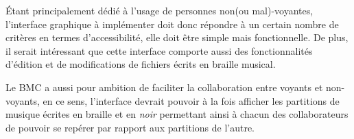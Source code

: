   Étant principalement dédié à l'usage de personnes non(ou mal)-voyantes, l'interface graphique à implémenter doit donc répondre à un certain nombre de critères en termes d'accessibilité, elle doit être simple mais fonctionnelle.
  De plus, il serait intéressant que cette interface comporte aussi des fonctionnalités d'édition et de modifications de fichiers écrits en braille musical.
   
  Le BMC a aussi pour ambition de faciliter la collaboration entre voyants et non-voyants, en ce sens, l'interface devrait pouvoir à la fois afficher les partitions de musique écrites en braille et en \textit{noir} permettant ainsi à chacun des collaborateurs de pouvoir se repérer par rapport aux partitions de l'autre.    
